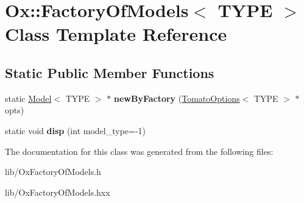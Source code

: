 \hypertarget{class_ox_1_1_factory_of_models}{}\section{Ox\+:\+:Factory\+Of\+Models$<$ T\+Y\+PE $>$ Class Template Reference}
\label{class_ox_1_1_factory_of_models}
\subsection*{Static Public Member Functions}
\begin{DoxyCompactItemize}
\item 
static \hyperlink{class_ox_1_1_model}{Model}$<$ T\+Y\+PE $>$ $\ast$ {\bfseries new\+By\+Factory} (\hyperlink{class_ox_1_1_tomato_options}{Tomato\+Options}$<$ T\+Y\+PE $>$ $\ast$opts)\hypertarget{class_ox_1_1_factory_of_models_adb04f53af47233f441be4282a1574142}{}\label{class_ox_1_1_factory_of_models_adb04f53af47233f441be4282a1574142}

\item 
static void {\bfseries disp} (int model\+\_\+type=-\/1)\hypertarget{class_ox_1_1_factory_of_models_a39b543260deef66d9d8bbffbbbc9d8de}{}\label{class_ox_1_1_factory_of_models_a39b543260deef66d9d8bbffbbbc9d8de}

\end{DoxyCompactItemize}


The documentation for this class was generated from the following files\+:\begin{DoxyCompactItemize}
\item 
lib/Ox\+Factory\+Of\+Models.\+h\item 
lib/Ox\+Factory\+Of\+Models.\+hxx\end{DoxyCompactItemize}
